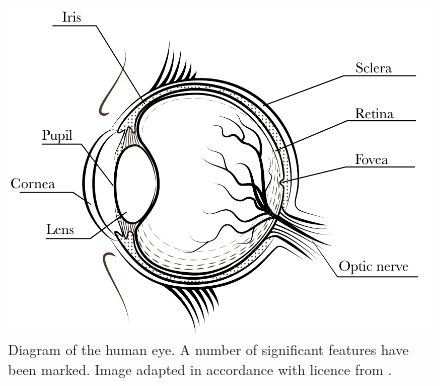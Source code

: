 

\begin{figure}
    \centering
    \includegraphics[width=0.8\linewidth]{figures/eye.pdf}
    \caption{Diagram of the human eye. A number of significant features have been marked. Image adapted in accordance with licence from \cite{freepik}.}
    \label{fig:anatomy}
\end{figure}

